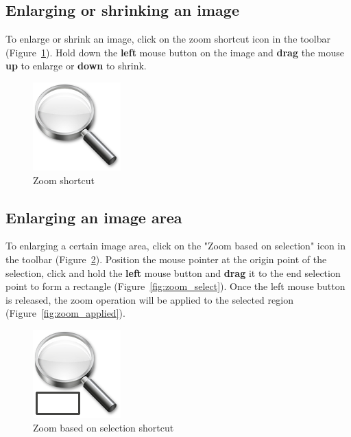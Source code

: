\subsection{Enlarging or shrinking an image}

To enlarge or shrink an image, click on the zoom shortcut icon in the toolbar (Figure~\ref{fig:zoom_icon}). Hold down the \textbf{left} mouse button on the image and \textbf{drag} the mouse \textbf{up} to enlarge or \textbf{down} to shrink.

\begin{figure}[!htb]
\centering
\includegraphics[scale=0.25]{../user_guide_figures/icons/tool_zoom_original.png}
\caption{Zoom shortcut}
\label{fig:zoom_icon}
\end{figure}

\subsection{Enlarging an image area}

To enlarging a certain image area, click on the "Zoom based on selection" icon in the toolbar (Figure~\ref{fig:zoom_icon_loc}). Position the mouse pointer at the origin point of the selection, click and hold the \textbf{left} mouse button and \textbf{drag} it to the end selection point to form a rectangle (Figure~\ref{fig:zoom_select}). Once the left mouse button is released, the zoom operation will be applied to the selected region (Figure~\ref{fig:zoom_applied}).

\begin{figure}[!htb]
\centering
\includegraphics[scale=0.25]{../user_guide_figures/icons/tool_zoom_select_original.png}
\caption{Zoom based on selection shortcut}
\label{fig:zoom_icon_loc}
\end{figure}

